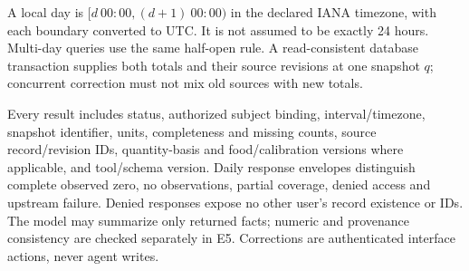 A local day is $[d\ 00{:}00,(d+1)\ 00{:}00)$ in the declared IANA timezone, with each boundary converted to UTC. It is not assumed to be exactly 24 hours. Multi-day queries use the same half-open rule. A read-consistent database transaction supplies both totals and their source revisions at one snapshot $q$; concurrent correction must not mix old sources with new totals.

Every result includes status, authorized subject binding, interval/timezone, snapshot identifier, units, completeness and missing counts, source record/revision IDs, quantity-basis and food/calibration versions where applicable, and tool/schema version. Daily response envelopes distinguish complete observed zero, no observations, partial coverage, denied access and upstream failure. Denied responses expose no other user's record existence or IDs. The model may summarize only returned facts; numeric and provenance consistency are checked separately in E5. Corrections are authenticated interface actions, never agent writes.


